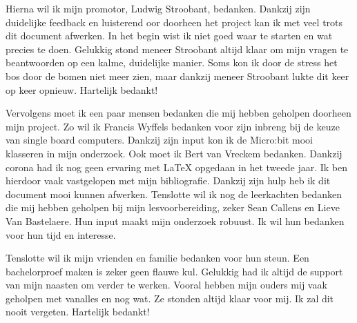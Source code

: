 Hierna wil ik mijn promotor, Ludwig Stroobant, bedanken. Dankzij zijn duidelijke feedback en luisterend oor doorheen het project kan ik met veel trots dit document afwerken. In het begin wist ik niet goed waar te starten en wat precies te doen. Gelukkig stond meneer Stroobant altijd klaar om mijn vragen te beantwoorden op een kalme, duidelijke manier. Soms kon ik door de stress het bos door de bomen niet meer zien, maar dankzij meneer Stroobant lukte dit keer op keer opnieuw. Hartelijk bedankt!

Vervolgens moet ik een paar mensen bedanken die mij hebben geholpen doorheen mijn project. Zo wil ik Francis Wyffels bedanken voor zijn inbreng bij de keuze van single board computers. Dankzij zijn input kon ik de Micro:bit mooi klasseren in mijn onderzoek. Ook moet ik Bert van Vreckem bedanken. Dankzij corona had ik nog geen ervaring met LaTeX opgedaan in het tweede jaar. Ik ben hierdoor vaak vastgelopen met mijn bibliografie. Dankzij zijn hulp heb ik dit document mooi kunnen afwerken. Tenslotte wil ik nog de leerkachten bedanken die mij hebben geholpen bij mijn lesvoorbereiding, zeker Sean Callens en Lieve Van Bastelaere. Hun input maakt mijn onderzoek robuust. Ik wil hun bedanken voor hun tijd en interesse.

Tenslotte wil ik mijn vrienden en familie bedanken voor hun steun. Een bachelorproef maken is zeker geen flauwe kul. Gelukkig had ik altijd de support van mijn naasten om verder te werken. Vooral hebben mijn ouders mij vaak geholpen met vanalles en nog wat. Ze stonden altijd klaar voor mij. Ik zal dit nooit vergeten. Hartelijk bedankt!

  